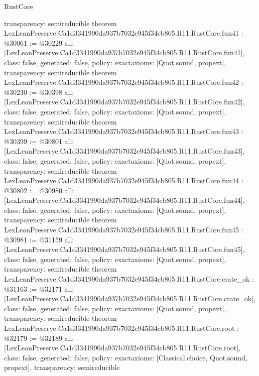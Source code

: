 \begin{lexlean}{RustCore}
\begin{coremodule}
{  transparency: semireducible
}
theorem LexLeanPreserve.Ca1d3341990da937b7032e945f34cb805.R11.RustCore.fun41 : @30061 := @30229 {
  all: [LexLeanPreserve.Ca1d3341990da937b7032e945f34cb805.R11.RustCore.fun41],
  class: false,
  generated: false,
  policy: exact{axioms: [Quot.sound, propext]},
  transparency: semireducible
}
theorem LexLeanPreserve.Ca1d3341990da937b7032e945f34cb805.R11.RustCore.fun42 : @30230 := @30398 {
  all: [LexLeanPreserve.Ca1d3341990da937b7032e945f34cb805.R11.RustCore.fun42],
  class: false,
  generated: false,
  policy: exact{axioms: [Quot.sound, propext]},
  transparency: semireducible
}
theorem LexLeanPreserve.Ca1d3341990da937b7032e945f34cb805.R11.RustCore.fun43 : @30399 := @30801 {
  all: [LexLeanPreserve.Ca1d3341990da937b7032e945f34cb805.R11.RustCore.fun43],
  class: false,
  generated: false,
  policy: exact{axioms: [Quot.sound, propext]},
  transparency: semireducible
}
theorem LexLeanPreserve.Ca1d3341990da937b7032e945f34cb805.R11.RustCore.fun44 : @30802 := @30980 {
  all: [LexLeanPreserve.Ca1d3341990da937b7032e945f34cb805.R11.RustCore.fun44],
  class: false,
  generated: false,
  policy: exact{axioms: [Quot.sound, propext]},
  transparency: semireducible
}
theorem LexLeanPreserve.Ca1d3341990da937b7032e945f34cb805.R11.RustCore.fun45 : @30981 := @31159 {
  all: [LexLeanPreserve.Ca1d3341990da937b7032e945f34cb805.R11.RustCore.fun45],
  class: false,
  generated: false,
  policy: exact{axioms: [Quot.sound, propext]},
  transparency: semireducible
}
theorem LexLeanPreserve.Ca1d3341990da937b7032e945f34cb805.R11.RustCore.crate_ok : @31163 := @32171 {
  all: [LexLeanPreserve.Ca1d3341990da937b7032e945f34cb805.R11.RustCore.crate_ok],
  class: false,
  generated: false,
  policy: exact{axioms: [Quot.sound, propext]},
  transparency: semireducible
}
theorem LexLeanPreserve.Ca1d3341990da937b7032e945f34cb805.R11.RustCore.root : @32179 := @32189 {
  all: [LexLeanPreserve.Ca1d3341990da937b7032e945f34cb805.R11.RustCore.root],
  class: false,
  generated: false,
  policy: exact{axioms: [Classical.choice, Quot.sound, propext]},
  transparency: semireducible
}


\end{coremodule}
\end{lexlean}
